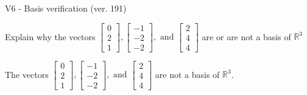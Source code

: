 \begin{exercise}
  \begin{exerciseTitle}V6 - Basis verification (ver. 191)\end{exerciseTitle}
  \begin{exerciseStatement}
    Explain why the vectors \(\left[\begin{array}{r}
0 \\
2 \\
1
\end{array}\right] , \left[\begin{array}{r}
-1 \\
-2 \\
-2
\end{array}\right] , \text{ and } \left[\begin{array}{r}
2 \\
4 \\
4
\end{array}\right]\) are or are not a basis of \(\mathbb{R}^3\)	


  \end{exerciseStatement}
  \begin{exerciseAnswer}
   The vectors \(\left[\begin{array}{r}
0 \\
2 \\
1
\end{array}\right] , \left[\begin{array}{r}
-1 \\
-2 \\
-2
\end{array}\right] , \text{ and } \left[\begin{array}{r}
2 \\
4 \\
4
\end{array}\right]\) 
  	 are not  a basis of \(\mathbb{R}^3\).
  


  \end{exerciseAnswer}
\end{exercise}